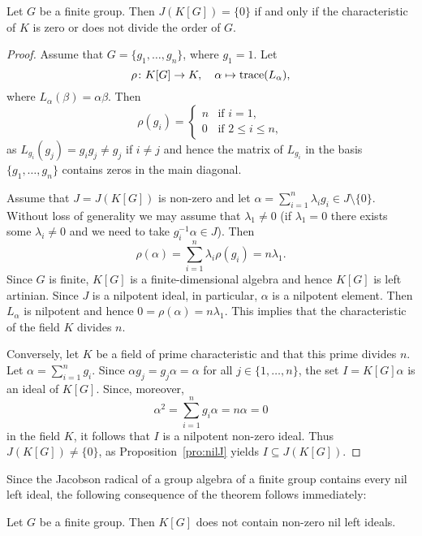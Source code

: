 \begin{theorem}[Maschke]
	Let $G$ be a finite group. Then $J(K[G])=\{0\}$ if and only 
	if the characteristic of $K$ is zero 
	or does not divide the order of $G$. 
\end{theorem}

\begin{proof}
	Assume that $G=\{g_1,\dots,g_n\}$, where $g_1=1$. Let 
	\[
	\rho\colon K[G]\to K,
	\quad
	\alpha\mapsto\operatorname{trace}(L_{\alpha}),
	\]
	where 
	$L_{\alpha}(\beta)=\alpha\beta$. Then 
	\[
	\rho(g_i)=\begin{cases}
	    n & \text{if $i=1$,}\\
	    0 & \text{if $2\leq i\leq n$},
	\end{cases}
	\]
	as $L_{g_i}(g_j)=g_{i}g_j\ne g_j$ if $i\ne j$ and hence the matrix of 
	$L_{g_i}$ in the basis $\{g_1,\dots,g_n\}$ contains zeros in the main diagonal.

	Assume that $J=J(K[G])$ is non-zero and let 
	$\alpha=\sum_{i=1}^n\lambda_ig_i\in J\setminus\{0\}$. Without loss of generality
	we may assume that $\lambda_1\ne 0$ (if $\lambda_1=0$ there exists some 
	$\lambda_i\ne 0$ and we need to take $g_i^{-1}\alpha\in J$). Then 
	\[
		\rho(\alpha)=\sum_{i=1}^n \lambda_i\rho(g_i)=n\lambda_1.
	\]
	Since $G$ is finite, $K[G]$ is a finite-dimensional algebra and hence 
	$K[G]$ is left artinian. Since $J$ is a nilpotent ideal, 
	in particular, $\alpha$ is a nilpotent element. Then 
	$L_{\alpha}$ is nilpotent and hence $0=\rho(\alpha)=n\lambda_1$. This implies that
	the characteristic of the field $K$ divides $n$. 

	Conversely, let $K$ be a field of prime characteristic and that this prime divides 
	$n$. Let $\alpha=\sum_{i=1}^ng_i$. Since $\alpha
	g_j=g_j\alpha=\alpha$ for all $j\in\{1,\dots,n\}$, the set 
	$I=K[G]\alpha$ is an ideal of $K[G]$. Since, moreover,   
	\[
		\alpha^2=\sum_{i=1}^n g_i\alpha=n\alpha=0
	\]
	in the field $K$, it follows that $I$ is a nilpotent non-zero ideal. Thus $J(K[G])\ne\{0\}$, 
	as Proposition~\ref{pro:nilJ} yields $I\subseteq J(K[G])$.
\end{proof}

Since the Jacobson radical of a group algebra of a finite group contains 
every nil left ideal, the following consequence of the theorem follows immediately:

\begin{corollary}
	\label{cor:GfinitoNOnil}
	Let $G$ be a finite group. Then $K[G]$ does not contain non-zero nil left ideals. 
\end{corollary}


